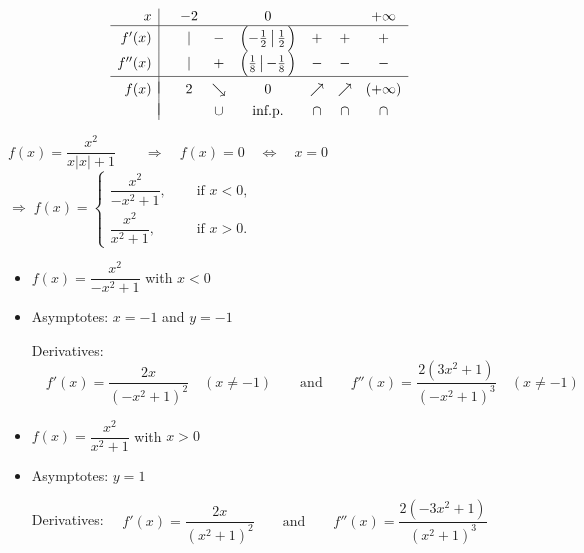 \begin{Answer}
    		
    		 \[ \begin{array}{r|ccccccc}
                x &  & -2 &  & 0 & &  & +\infty \\
                \hline
                f'(x)   &  & | &  - &  \left(-\frac{1}{2}\left|\,\frac{1}{2} \right.\right) & + & + & +  \\
                f''(x)  &  & | &  + & \left(\frac{1}{8}\left|\,-\frac{1}{8}\right.\right)  & - & - & - \\
                \hline
                &&&&&\vspace{-0.3cm}\\
                f(x)    &  & 2  & \searrow & 0 & \nearrow & \nearrow & (+\infty) \\
                &&&&&\vspace{-0.3cm}\\                                                                              
                       & & & \cup  & \mbox{inf.p.} & \cap & \cap & \cap \\
                \end{array}\]
    		
    
    	\Question $f(x) = \dfrac{x^2}{x|x| + 1}
    		\qquad \Rightarrow \quad  f(x)=0 \quad \Leftrightarrow \quad x=0$ \\[0.2cm]
    		$\Rightarrow \; f(x)= \left\{ \begin{array}{ll} \dfrac{x^2}{-x^2 + 1}, & \quad \text{ if }  x <0, \\
    		\dfrac{x^2}{x^2 + 1}, & \quad \text{ if } x > 0. \end{array} \right.$ \\[0.2cm]
    		
    		\begin{itemize}
    		    \item $f(x) = \dfrac{x^2}{-x^2 + 1}$ \quad with $x <0$
    		    \item [] Asymptotes: \quad $x=-1$ \quad and \quad $y=-1 $ \par
                         Derivatives: $\quad f'(x)=\dfrac{2x}{(-x^2+1)^2} \quad (x \neq -1) \qquad\mbox{and}\qquad f''(x)=\dfrac{2(3x^2+1)}{(-x^2+1)^3} \quad (x \neq -1) $
    		    \item $f(x) = \dfrac{x^2}{x^2 + 1}$ \quad with $x > 0$
    		     \item [] Asymptotes: \quad $y=1 $ \par
                         Derivatives: $\quad f'(x)=\dfrac{2x}{(x^2+1)^2}  \qquad\mbox{and}\qquad f''(x)=\dfrac{2(-3x^2+1)}{(x^2+1)^3} $
    		\end{itemize}
    		

\end{Answer}
